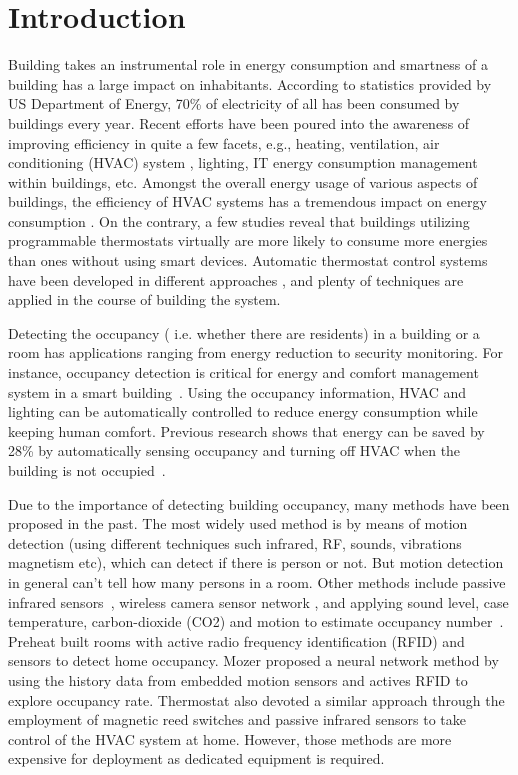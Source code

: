\section{Introduction}

Building takes an instrumental role in energy consumption and smartness of a
building has a large impact on inhabitants. According to statistics provided by
US Department of Energy, 70\% of electricity of all has been consumed by
buildings every year. Recent efforts have been poured into the awareness of
improving efficiency in quite a few facets, e.g., heating, ventilation, air
conditioning (HVAC) system \cite{erickson2009energy}\cite{gao2009selfprog},
lighting\cite{delaney2009eval}, IT energy consumption management within
buildings\cite{agarwal2009augnet}\cite{agarwal2010sleep}, etc. Amongst the
overall energy usage of various aspects of buildings, the efficiency of HVAC
systems has a tremendous impact on energy consumption \cite{hobby2012analysis}.
On the contrary, a few studies \cite{bias1999elec} reveal that buildings
utilizing programmable thermostats virtually are more likely to consume more
energies than ones without using smart devices. Automatic thermostat control
systems have been developed in different approaches
\cite{thomas2012intelligent}\cite{lu2012eval}, and plenty of techniques are
applied in the course of building the system.

Detecting the occupancy ( i.e. whether there are residents) in a
building or a room has applications ranging from energy reduction
to security monitoring.
For instance, occupancy detection is critical for energy and comfort
management system in a smart building~\cite{Nguyen2013Energy}.  Using
the occupancy information, HVAC and lighting can be automatically
controlled to reduce energy consumption while keeping human comfort.
Previous research shows that energy can be saved by 28\% by
automatically sensing occupancy and turning off HVAC when the building
is not occupied~\cite{Lu:SenSys10}.

Due to the importance of detecting building occupancy, many methods
have been proposed in the past. The most widely used method is by
means of motion detection (using different techniques such infrared,
RF, sounds, vibrations magnetism etc), which can detect if there is
person or not. But motion detection in general can't tell how many
persons in a room.  Other methods include passive infrared
sensors~\cite{Dodier2006Building}, wireless camera sensor network
\cite{erickson2009energy}, and applying sound level, case temperature,
carbon-dioxide (CO2) and motion to estimate occupancy
number~\cite{Ekwevugbe2013Real}.  Preheat \cite{scott2011ctrl} built rooms with
active radio frequency identification (RFID) and sensors to detect
home occupancy. Mozer \cite{mozer1997neurothermostat} proposed a neural network method by
using the history data from embedded motion sensors and actives RFID
to explore occupancy rate. Thermostat \cite{lu2010smartthermostat} also devoted a
similar approach through the employment of magnetic reed switches and
passive infrared sensors to take control of the HVAC system at
home. However, those methods are more expensive for deployment as
dedicated equipment is required.

